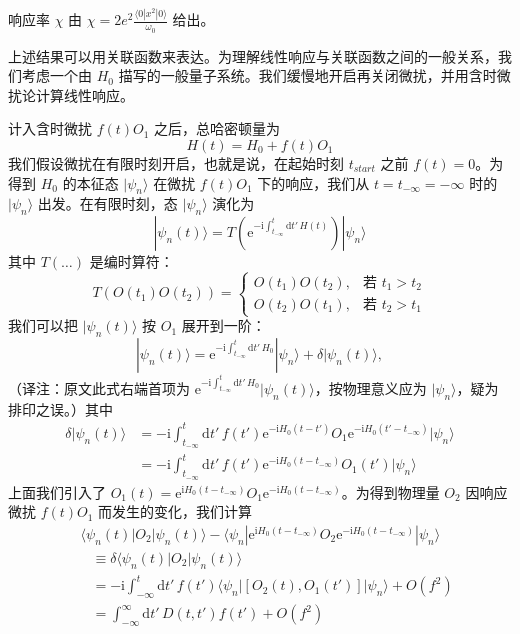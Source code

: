 响应率 $\chi$ 由 $\chi=2e^2\frac{\langle 0|x^2|0\rangle}{\omega_0}$ 给出。

上述结果可以用关联函数来表达。为理解线性响应与关联函数之间的一般关系，我们考虑一个由 $H_0$ 描写的一般量子系统。我们缓慢地开启再关闭微扰，并用含时微扰论计算线性响应。

计入含时微扰 $f(t)O_1$ 之后，总哈密顿量为
\begin{equation*}
H(t)=H_0+f(t)O_1
\end{equation*}
我们假设微扰在有限时刻开启，也就是说，在起始时刻 $t_{start}$ 之前 $f(t)=0$。为得到 $H_0$ 的本征态 $|\psi_n\rangle$ 在微扰 $f(t)O_1$ 下的响应，我们从 $t=t_{-\infty}=-\infty$ 时的 $|\psi_n\rangle$ 出发。在有限时刻，态 $|\psi_n\rangle$ 演化为
\begin{equation*}
|\psi_n(t)\rangle=T\left(\mathrm{e}^{-\mathrm{i}\int_{t_{-\infty}}^t\mathrm{d}t'\,H(t)}\right)|\psi_n\rangle\tag{2.2.2}
\end{equation*}
其中 $T(\dots)$ 是编时算符：
\begin{equation*}
T(O(t_1)O(t_2))=\left\{\begin{array}{ll}
O(t_1)O(t_2), & \text{若 } t_1>t_2\\
O(t_2)O(t_1), & \text{若 } t_2>t_1
\end{array}\right.
\end{equation*}
我们可以把 $|\psi_n(t)\rangle$ 按 $O_1$ 展开到一阶：
\begin{equation*}
|\psi_n(t)\rangle=\mathrm{e}^{-\mathrm{i}\int_{t_{-\infty}}^t\mathrm{d}t'\,H_0}|\psi_n\rangle+\delta|\psi_n(t)\rangle,
\end{equation*}
（译注：原文此式右端首项为 $\mathrm{e}^{-\mathrm{i}\int_{t_{-\infty}}^t\mathrm{d}t'\,H_0}|\psi_n(t)\rangle$，按物理意义应为 $|\psi_n\rangle$，疑为排印之误。）其中
\begin{equation*}
\begin{aligned}
\delta|\psi_n(t)\rangle&=-\mathrm{i}\int_{t_{-\infty}}^t\mathrm{d}t'\,f(t')\mathrm{e}^{-\mathrm{i}H_0(t-t')}O_1\mathrm{e}^{-\mathrm{i}H_0(t'-t_{-\infty})}|\psi_n\rangle\\
&=-\mathrm{i}\int_{t_{-\infty}}^t\mathrm{d}t'\,f(t')\mathrm{e}^{-\mathrm{i}H_0(t-t_{-\infty})}O_1(t')|\psi_n\rangle
\end{aligned}
\end{equation*}
上面我们引入了 $O_1(t)=\mathrm{e}^{\mathrm{i}H_0(t-t_{-\infty})}O_1\mathrm{e}^{-\mathrm{i}H_0(t-t_{-\infty})}$。为得到物理量 $O_2$ 因响应微扰 $f(t)O_1$ 而发生的变化，我们计算
\begin{align*}
&\ \langle\psi_n(t)|O_2|\psi_n(t)\rangle-\langle\psi_n|\mathrm{e}^{\mathrm{i}H_0(t-t_{-\infty})}O_2\mathrm{e}^{-\mathrm{i}H_0(t-t_{-\infty})}|\psi_n\rangle\\
&\quad\equiv\delta\langle\psi_n(t)|O_2|\psi_n(t)\rangle\\
&\quad=-\mathrm{i}\int_{-\infty}^{t}\mathrm{d}t'\,f(t')\langle\psi_n|[O_2(t),O_1(t')]|\psi_n\rangle+O(f^2)\\
&\quad=\int_{-\infty}^{\infty}\mathrm{d}t'\,D(t,t')f(t')+O(f^2)\tag{2.2.3}
\end{align*}
